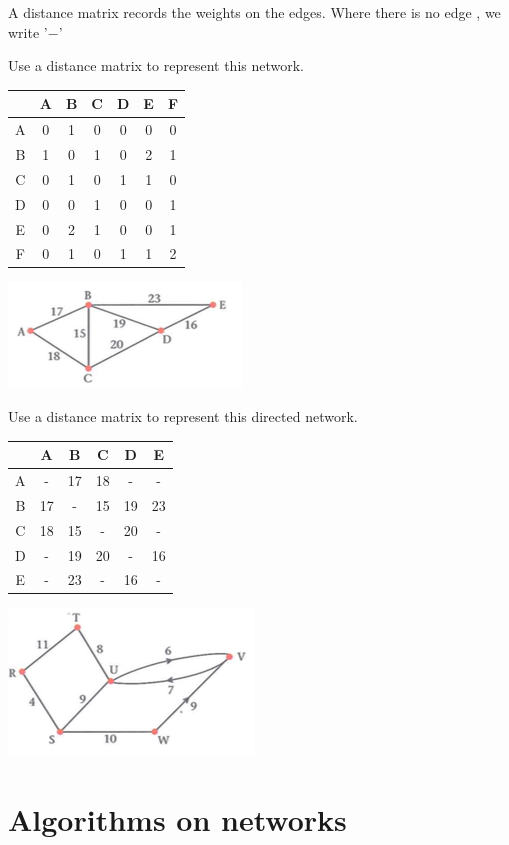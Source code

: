 \documentclass[a4paper]{article}
\begin{document}
\begin{defi}
	A distance matrix records the weights on the edges. Where there is no edge , we write '$-$'
\end{defi}
\begin{eg}
	Use a distance matrix to represent this network.\\
	\begin{tabular}{c|cccccc}
		  & A & B & C & D & E & F \\
		\hline
		A & 0 & 1 & 0 & 0 & 0 & 0 \\
		B & 1 & 0 & 1 & 0 & 2 & 1 \\
		C & 0 & 1 & 0 & 1 & 1 & 0 \\
		D & 0 & 0 & 1 & 0 & 0 & 1 \\
		E & 0 & 2 & 1 & 0 & 0 & 1 \\
		F & 0 & 1 & 0 & 1 & 1 & 2 \\
	\end{tabular}
	\includegraphics{img_D/2_2ex2}
\end{eg}
\begin{eg}
	Use a distance matrix to represent this directed network.\\
	\begin{tabular}{c|ccccc}
		  & A  & B  & C  & D  & E  \\
		\hline
		A & -  & 17 & 18 & -  & -  \\
		B & 17 & -  & 15 & 19 & 23 \\
		C & 18 & 15 & -  & 20 & -  \\
		D & -  & 19 & 20 & -  & 16 \\
		E & -  & 23 & -  & 16 & -  \\
	\end{tabular}
	\includegraphics{img_D/2_2ex3}
\end{eg}
\section{Algorithms on networks}
\end{document}
